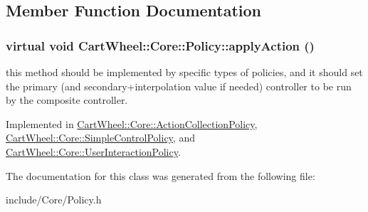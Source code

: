 \subsection{Member Function Documentation}
\hypertarget{classCartWheel_1_1Core_1_1Policy_acccd1ec26392309eff12c565ae9fb8c7}{
\subsubsection[{applyAction}]{\setlength{\rightskip}{0pt plus 5cm}virtual void CartWheel::Core::Policy::applyAction ()}}
\label{classCartWheel_1_1Core_1_1Policy_acccd1ec26392309eff12c565ae9fb8c7}
this method should be implemented by specific types of policies, and it should set the primary (and secondary+interpolation value if needed) controller to be run by the composite controller. 

Implemented in \hyperlink{classCartWheel_1_1Core_1_1ActionCollectionPolicy_afe57e1a3ba3f7f8463e1d1b550a57d51}{CartWheel::Core::ActionCollectionPolicy}, \hyperlink{classCartWheel_1_1Core_1_1SimpleControlPolicy_a29c91dcd0c95be19588a4d93412f3c3a}{CartWheel::Core::SimpleControlPolicy}, and \hyperlink{classCartWheel_1_1Core_1_1UserInteractionPolicy_a1b896f869b8d484f552fc5da8a40923f}{CartWheel::Core::UserInteractionPolicy}.



The documentation for this class was generated from the following file:\begin{DoxyCompactItemize}
\item 
include/Core/Policy.h\end{DoxyCompactItemize}
